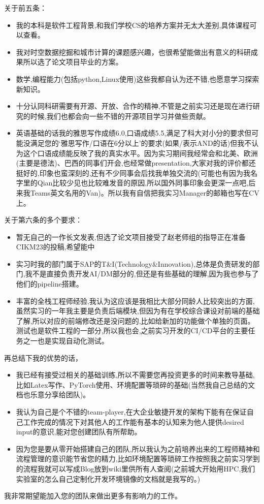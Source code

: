 \documentclass{resume}
\begin{document}
关于前五条：
\begin{itemize}[parsep=0.5ex]
  \item 我的本科是软件工程背景,和我们学校CS的培养方案并无太大差别,具体课程可以查看\href{https://portland-my.sharepoint.com/:f:/g/personal/qma233-c_my_cityu_edu_hk/EvgUYxJ87_hImoWnjgUrumMBBdONb_MJCfrogSKQKWOjBQ?e=ISmUIC}{\color{blue}{我的本科成绩单}}。
  \item 我对时空数据挖掘和城市计算的课题感兴趣，也很希望能做出有意义的科研成果所以选了论文项目毕业的方案。
  \item 数学,编程能力(包括python,Linux使用)这些我都自认为还不错,也愿意学习探索新知识。
  \item 十分认同科研需要有开源、开放、合作的精神,不管是之前实习还是现在进行研究的时候,我们也都会向一些不错的开源项目学习并做些贡献。
  \item 英语基础的话我的雅思写作成绩6.0,口语成绩5.5,满足了科大对小分的要求但可能没满足您的`雅思写作/口语在6分以上'的要求(如果/表示AND的话)但我不认为这个口语成绩能反映了我的真实水平。因为实习期间我经常会和北美、欧洲(主要是德法)、巴西的同事们开会,也经常做presentation,大家对我的评价都还挺好的,印象也蛮深刻的,还有不少同事会后找我单独交流的(可能也有因为我名字里的Qian比较少见也比较难发音的原因,所以国外同事印象会更深一点吧,后来我Teams英文名用的Van)。所以我有自信把我实习Manager的邮箱也写在CV上。
\end{itemize}
关于第六条的多个要求：
\begin{itemize}
  \item 暂无自己的一作长文发表,但选了论文项目接受了赵老师组的指导正在准备CIKM23的投稿,希望能中
  \item 实习时我的部门属于SAP的T\&I(Technology\&Innovation),总体是负责研发的部门,我不是直接负责开发AI/DM部分的,但还是有些基础的理解,因为我也参与了他们的pipeline搭建。
  \item 丰富的全栈工程师经验,我认为这应该是我相比大部分同龄人比较突出的方面,虽然实习的一年我主要是负责后端模块,但因为有在学校综合课设对前端的基础了解,所以对应的前端修改还是没问题的,比如给新加的功能做个单独的页面。测试也是软件工程的一部分,所以我也会,之前实习开发的CI/CD平台的主要任务之一也是实现自动化测试。
\end{itemize}
再总结下我的优势的话，
\begin{itemize}
  \item 我已经有接受过相关的基础训练,所以不需要您再投资更多的时间来教导基础,比如Latex写作、PyTorch使用、环境配置等琐碎的基础(当然我自己总结的文档也乐意分享给团队)。
  \item 我认为自己是个不错的team-player,在大企业敏捷开发的架构下能有在保证自己工作完成的情况下对其他人的工作能有基本的认知来为他人提供desired input的意识,能对您创建团队有所帮助。
  \item 因为您是要从零开始搭建自己的团队,所以我认为之前培养出来的工程师精神和流程管理的意识能节省您的精力,比如环境配置等琐碎工作按照我之前实习学到的流程我就可以写成Blog放到wiki里供所有人查阅(之前城大开始用HPC,我们实验室的怎么自己定制化开发环境镜像的文档就是我写的。)
\end{itemize}
我非常期望能加入您的团队来做出更多有影响力的工作。
%
%
\end{document}
